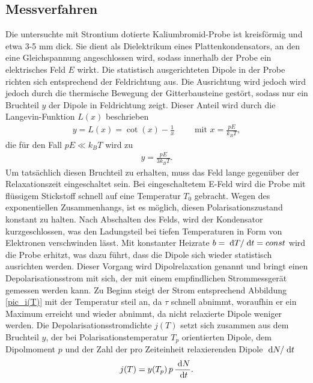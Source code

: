 \subsection{Messverfahren}
Die untersuchte mit Strontium dotierte Kaliumbromid-Probe ist kreisförmig und etwa 3-5 mm dick. Sie dient als Dielektrikum eines Plattenkondensators,
an den eine Gleichspannung angeschlossen wird, sodass innerhalb der Probe ein elektrisches Feld $E$ wirkt. Die statistisch ausgerichteten 
Dipole in der Probe richten sich entsprechend der Feldrichtung aus. Die Ausrichtung wird jedoch wird jedoch durch die thermische Bewegung der 
Gitterbausteine gestört, sodass nur ein Bruchteil $y$ der Dipole in Feldrichtung zeigt. Dieser Anteil wird durch die Langevin-Funktion $L(x)$
beschrieben
\begin{align}
 y = L(x) = \cot(x) - \frac{1}{x} \hspace{1cm}\text{mit }x=\frac{pE}{k_B T},
\end{align}
die für den Fall $pE\ll k_B T$ wird zu 
\begin{align}
 y = \frac{pE}{3k_B T}.
 \label{eq_y(T)}
\end{align}
Um tatsächlich diesen Bruchteil zu erhalten, muss das Feld lange gegenüber der Relaxationszeit eingeschaltet sein. Bei eingeschaltetem E-Feld wird
die Probe mit flüssigem Stickstoff schnell auf eine Temperatur $T_0$ gebracht. Wegen des exponentiellen Zusammenhangs, ist es möglich, diesen
Polarisationszustand konstant zu halten. Nach Abschalten des Felds, wird der Kondensator kurzgeschlossen, was den Ladungsteil bei tiefen Temperaturen
in Form von Elektronen verschwinden lässt. Mit konstanter Heizrate $b=\; \mathrm{d} T/\; \mathrm{d} t = const$ wird die Probe erhitzt, was dazu führt, dass die Dipole
sich wieder statistisch ausrichten werden. Dieser Vorgang wird Dipolrelaxation genannt und bringt einen Depolarisationsstrom mit sich, der mit einem
empfindlichen Strommessgerät gemessen werden kann. Zu Beginn steigt der Strom entsprechend Abbildung \ref{pic_i(T)} mit der Temperatur steil an, da $\tau$ schnell abnimmt, woraufhin er
ein Maximum erreicht und wieder abnimmt, da nicht relaxierte Dipole weniger werden. Die Depolarisationsstromdichte $j(T)$ setzt sich zusammen aus dem
Bruchteil $y$, der bei Polarisationstemperatur $T_p$ orientierten Dipole, dem Dipolmoment $p$ und der Zahl der pro Zeiteinheit relaxierenden Dipole
$\; \mathrm{d} N/\; \mathrm{d} t$
\begin{align}
 j(T) = y(T_p)\, p\, \frac{\; \mathrm{d} N}{\; \mathrm{d} t}.
 \label{eq_Depoldichte}
\end{align}
